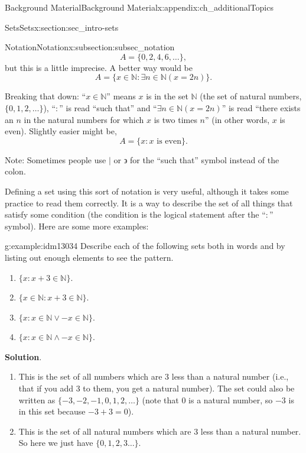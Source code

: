 \documentclass[oneside,10pt,]{book}
\numberwithin{equation}{chapter}
\def\N{\mathbb N}
\def\st{:}
\begin{document}
\begin{appendixptx}{Background Material}{}{Background Material}{}{}{x:appendix:ch_additionalTopics}
\begin{sectionptx}{Sets}{}{Sets}{}{}{x:section:sec_intro-sets}
\begin{subsectionptx}{Notation}{}{Notation}{}{}{x:subsection:subsec_notation}
\begin{equation*}
A = \{0, 2, 4, 6, \ldots\},
\end{equation*}
but this is a little imprecise. A better way would be%
\begin{equation*}
A = \{x \in \N \st \exists n\in \N ( x = 2 n)\}.
\end{equation*}
%
\par
Breaking that down: ``\(x \in \N\)'' means \(x\) is in the set \(\N\) (the set of natural numbers, \(\{0,1,2,\ldots\}\)), ``\(:\)'' is read ``such that'' and ``\(\exists n\in \N (x = 2n) \)'' is read ``there exists an \(n\) in the natural numbers for which \(x\) is two times \(n\)'' (in other words, \(x\) is even). Slightly easier might be,%
\begin{equation*}
A = \{x \st x\text{ is even} \}.
\end{equation*}
%
\par
Note: Sometimes people use \(|\) or \(\backepsilon\) for the ``such that'' symbol instead of the colon.%
\par
Defining a set using this sort of notation is very useful, although it takes some practice to read them correctly. It is a way to describe the set of all things that satisfy some condition (the condition is the logical statement after the ``\(\st\)'' symbol). Here are some more examples:%
\begin{example}{}{g:example:idm13034}%
Describe each of the following sets both in words and by listing out enough elements to see the pattern.%
\par
%
\begin{enumerate}
\item{}\(\{x \st x + 3 \in \N\}\).%
\item{}\(\{x \in \N \st x + 3 \in \N\}\).%
\item{}\(\{x \st x \in \N \vee -x \in \N\}\).%
\item{}\(\{x \st x \in \N \wedge -x \in \N\}\).%
\end{enumerate}
%
\par\smallskip%
\noindent\textbf{Solution}.\hypertarget{g:solution:idm13047}{}\quad{}%
\begin{enumerate}
\item{}This is the set of all numbers which are 3 less than a natural number (i.e., that if you add 3 to them, you get a natural number). The set could also be written as \(\{-3, -2, -1, 0, 1, 2, \ldots\}\) (note that 0 is a natural number, so \(-3\) is in this set because \(-3 + 3 = 0\)).%
\item{}This is the set of all natural numbers which are 3 less than a natural number. So here we just have \(\{0, 1, 2,3 \ldots\}\).%

\end{enumerate}
\end{example}
\end{subsectionptx}
\end{sectionptx}
\end{appendixptx}
\end{document}
